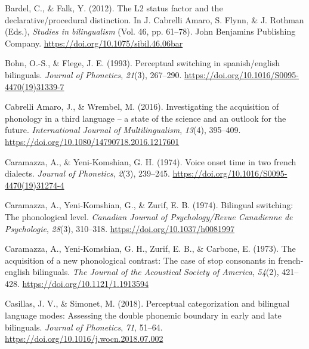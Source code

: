 \documentclass[
  man,floatsintext]{apa6}
\newlength{\cslhangindent}
\newlength{\cslentryspacingunit} %
\newenvironment{CSLReferences}[2] %
 {%
  \setlength{\parindent}{0pt}
  \ifodd #1
  \let\oldpar\par
  \def\par{\hangindent=\cslhangindent\oldpar}
  \fi
  \setlength{\parskip}{#2\cslentryspacingunit}
 }%
 {}
\begin{document}
\hypertarget{refs}{}
\begin{CSLReferences}{1}{0}
\leavevmode{}%
Bardel, C., \& Falk, Y. (2012). The L2 status factor and the declarative/procedural distinction. In J. Cabrelli Amaro, S. Flynn, \& J. Rothman (Eds.), \emph{Studies in bilingualism} (Vol. 46, pp. 61--78). John Benjamins Publishing Company. \url{https://doi.org/10.1075/sibil.46.06bar}

\leavevmode{}%
Bohn, O.-S., \& Flege, J. E. (1993). Perceptual switching in spanish/english bilinguals. \emph{Journal of Phonetics}, \emph{21}(3), 267--290. \url{https://doi.org/10.1016/S0095-4470(19)31339-7}

\leavevmode{}%
Cabrelli Amaro, J., \& Wrembel, M. (2016). Investigating the acquisition of phonology in a third language -- a state of the science and an outlook for the future. \emph{International Journal of Multilingualism}, \emph{13}(4), 395--409. \url{https://doi.org/10.1080/14790718.2016.1217601}

\leavevmode{}%
Caramazza, A., \& Yeni-Komshian, G. H. (1974). Voice onset time in two french dialects. \emph{Journal of Phonetics}, \emph{2}(3), 239--245. \url{https://doi.org/10.1016/S0095-4470(19)31274-4}

\leavevmode{}%
Caramazza, A., Yeni-Komshian, G., \& Zurif, E. B. (1974). Bilingual switching: The phonological level. \emph{Canadian Journal of Psychology/Revue Canadienne de Psychologie}, \emph{28}(3), 310--318. \url{https://doi.org/10.1037/h0081997}

\leavevmode{}%
Caramazza, A., Yeni‐Komshian, G. H., Zurif, E. B., \& Carbone, E. (1973). The acquisition of a new phonological contrast: The case of stop consonants in french‐english bilinguals. \emph{The Journal of the Acoustical Society of America}, \emph{54}(2), 421--428. \url{https://doi.org/10.1121/1.1913594}

\leavevmode{}%
Casillas, J. V., \& Simonet, M. (2018). Perceptual categorization and bilingual language modes: Assessing the double phonemic boundary in early and late bilinguals. \emph{Journal of Phonetics}, \emph{71}, 51--64. \url{https://doi.org/10.1016/j.wocn.2018.07.002}


\end{CSLReferences}
\end{document}
